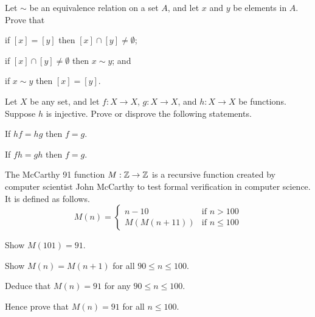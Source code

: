 \begin{problem}\label{problem-equivalence-class-equivalence}
    Let $\sim$ be an equivalence relation on a set $A$, and let $x$ and $y$ be elements in $A$. Prove that
    \begin{partquestions}{\alph*}
        \item if $[x] = [y]$ then $[x] \cap [y] \neq \emptyset$;
        \item if $[x] \cap [y] \neq \emptyset$ then $x \mathrel{\sim} y$; and
        \item if $x \mathrel{\sim} y$ then $[x] = [y]$.
    \end{partquestions}
\end{problem}

\begin{problem}
    Let $X$ be any set, and let $f: X \to X$, $g: X \to X$, and $h: X \to X$ be functions. Suppose $h$ is injective. Prove or disprove the following statements.
    \begin{partquestions}{\alph*}
        \item If $hf = hg$ then $f = g$.
        \item If $fh = gh$ then $f = g$.
    \end{partquestions}
\end{problem}

\newpage

\begin{problem}
    The McCarthy 91 function $M: \mathbb{Z} \to \mathbb{Z}$ is a recursive function created by computer scientist John McCarthy to test formal verification in computer science. It is defined as follows.
    \[
        M(n) = \begin{cases}
            n - 10 & \text{if } n > 100\\
            M(M(n+11)) & \text{if } n \leq 100
        \end{cases}
    \]
    \begin{partquestions}{\roman*}
        \item Show $M(101) = 91$.
        \item Show $M(n) = M(n+1)$ for all $90 \leq n \leq 100$.
        \item Deduce that $M(n) = 91$ for any $90 \leq n \leq 100$.
        \item Hence prove that $M(n) = 91$ for all $n \leq 100$.
    \end{partquestions}
\end{problem}

